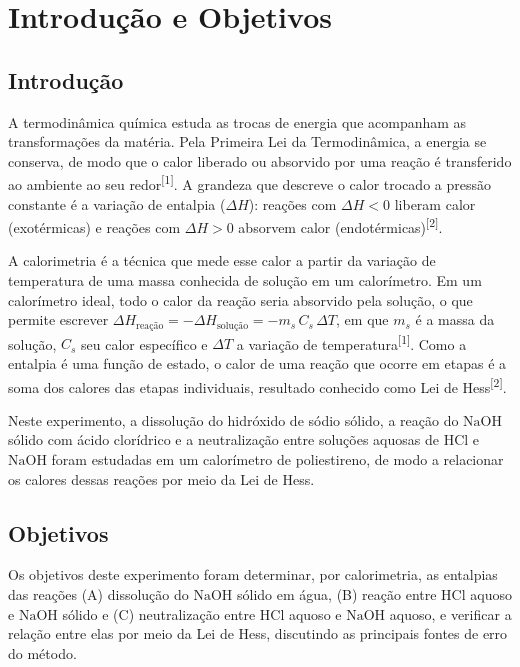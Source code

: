 \section{Introdução e Objetivos}
    \subsection{Introdução}
    A termodinâmica química estuda as trocas de energia que acompanham as transformações da matéria. Pela Primeira Lei da Termodinâmica, a energia se conserva, de modo que o calor liberado ou absorvido por uma reação é transferido ao ambiente ao seu redor\textsuperscript{[1]}. A grandeza que descreve o calor trocado a pressão constante é a variação de entalpia ($\Delta H$): reações com $\Delta H < 0$ liberam calor (exotérmicas) e reações com $\Delta H > 0$ absorvem calor (endotérmicas)\textsuperscript{[2]}.

    A calorimetria é a técnica que mede esse calor a partir da variação de temperatura de uma massa conhecida de solução em um calorímetro. Em um calorímetro ideal, todo o calor da reação seria absorvido pela solução, o que permite escrever $\Delta H_{\text{reação}} = -\Delta H_{\text{solução}} = -m_s\,C_s\,\Delta T$, em que $m_s$ é a massa da solução, $C_s$ seu calor específico e $\Delta T$ a variação de temperatura\textsuperscript{[1]}. Como a entalpia é uma função de estado, o calor de uma reação que ocorre em etapas é a soma dos calores das etapas individuais, resultado conhecido como Lei de Hess\textsuperscript{[2]}.

    Neste experimento, a dissolução do hidróxido de sódio sólido, a reação do $\mathrm{NaOH}$ sólido com ácido clorídrico e a neutralização entre soluções aquosas de $\mathrm{HCl}$ e $\mathrm{NaOH}$ foram estudadas em um calorímetro de poliestireno, de modo a relacionar os calores dessas reações por meio da Lei de Hess.

    \subsection{Objetivos}
    Os objetivos deste experimento foram determinar, por calorimetria, as entalpias das reações (A) dissolução do $\mathrm{NaOH}$ sólido em água, (B) reação entre $\mathrm{HCl}$ aquoso e $\mathrm{NaOH}$ sólido e (C) neutralização entre $\mathrm{HCl}$ aquoso e $\mathrm{NaOH}$ aquoso, e verificar a relação entre elas por meio da Lei de Hess, discutindo as principais fontes de erro do método.
